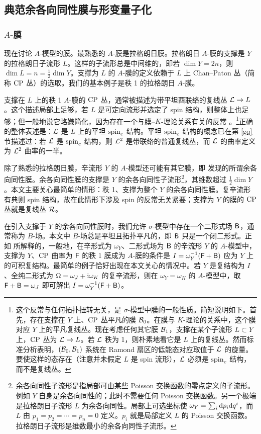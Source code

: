 \subsection{典范余各向同性膜与形变量子化}\label{abranes}

\subsubsection{$A$-膜}\label{aobranes}

现在讨论 $A$-模型的膜。最熟悉的 $A$-膜是拉格朗日膜。拉格朗日 $A$-膜的支撑是 $Y$ 的拉格朗日子流形 $L$。这样的子流形总是中间维的，即若 $\dim Y=2n$，则 $\dim L=n=\frac12\dim Y$。支撑为 $L$ 的 $A$-膜的定义依赖于 $L$ 上 Chan--Paton 丛（简称 ${\mathrm{CP}}$ 丛）的选取。我们的基本例子是秩 1 的拉格朗日 $A$-膜。

支撑在 $L$ 上的秩 1 $A$-膜的 ${\mathrm{CP}}$ 丛，通常被描述为带平坦酉联络的复线丛 ${\mathcal L}\to L$。这个描述局部上足够，若 $L$ 是可定向流形并选定了 spin 结构，则整体上也足够；但一般地说它略嫌简化，因为存在一个与膜--$K$-理论关系有关的反常 \cite{FW}。\footnote{\label{anomdesc}这个反常与任何拓扑扭转无关，是 $\sigma$-模型中膜的一般性质。简短说明如下。首先，存在支撑在 $Y$ 上、${\mathrm{CP}}$ 丛平凡的膜 ${\mathcal B}_0$。在膜与 $K$-理论的关系中，这个膜对应 $Y$ 上的平凡复线丛。现在考虑任何其它膜 ${\mathcal B}_1$，支撑在某个子流形 $L\subset Y$ 上，${\mathrm{CP}}$ 丛为 ${\mathcal L}\to L$。若 ${\mathcal L}$ 秩为 1，则朴素地看它是 $L$ 上的复线丛。然而标准分析表明，$({\mathcal B}_0,{\mathcal B}_1)$ 系统在 Ramond 扇区的低能态对应取值于 ${\mathcal L}$ 的旋量。要使这样的态存在（注意并未假定 $L$ 是 spin 流形），${\mathcal L}$ 必须是 ${\mathrm{spin}_c}$ 结构，而不是复线丛。}正确的整体表述是：${\mathcal L}$ 是 $L$ 上的平坦 ${\mathrm{spin}_c}$ 结构。平坦 ${\mathrm{spin}_c}$ 结构的概念已在第 \ref{gq} 节描述过：若 ${\mathcal L}$ 是 ${\mathrm{spin}_c}$ 结构，则 ${\mathcal L}^2$ 是带联络的普通复线丛，而 ${\mathcal L}$ 的曲率定义为 ${\mathcal L}^2$ 曲率的一半。

除了熟悉的拉格朗日膜，辛流形 $Y$ 的 $A$-模型还可能有其它膜，即 \cite{KO} 发现的所谓余各向同性膜。余各向同性膜的支撑是 $Y$ 的余各向同性子流形\footnote{余各向同性子流形是指局部可由某些 Poisson 交换函数的零点定义的子流形。例如 $Y$ 自身是余各向同性的；此时不需要任何 Poisson 交换函数。另一个极端是拉格朗日子流形 $L$ 为余各向同性。局部上可选坐标使 $\omega_Y=\sum_i{\mathrm d} p_i{\mathrm d} q^i$，而 $L$ 由 $p_1=p_2=\cdots=p_n=0$ 定义。$p_i$ 就是局部定义 $L$ 的 Poisson 交换函数。拉格朗日子流形是维数最小的余各向同性子流形。}，其维数超过 $\frac12\dim Y$。本文主要关心最简单的情形：秩 1、支撑为整个 $Y$ 的余各向同性膜。复辛流形有典则 spin 结构，故在此情形下涉及 spin 的反常无关紧要；支撑为 $Y$ 的膜的 ${\mathrm{CP}}$ 丛就是复线丛 ${\mathcal R}$。

在引入支撑于 $Y$ 的余各向同性膜时，我们允许 $\sigma$-模型中存在一个二形式场 ${\sf B}$，通常称为 $B$-场。本文中 $B$-场总是平坦且拓扑平凡的，即 ${\sf B}$ 只是一个闭二形式。正如 \cite{KO} 所解释的，一般地，在辛形式为 $\omega_Y$、二形式场为 ${\sf B}$ 的辛流形 $Y$ 的 $A$-模型中，支撑为 $Y$、${\mathrm{CP}}$ 曲率为 ${\sf F}$ 的秩 1 膜成为 $A$-膜的条件是 $I=\omega_Y^{-1}({\sf F}+{\sf B})$ 应为 $Y$ 上的可积复结构。最简单的例子恰好出现在本文关心的情况中。若 $Y$ 是复结构为 $I$、全纯二形式为 $\Omega=\omega_J+{\mathrm i}\omega_K$ 的复辛流形，则在 $\omega_Y=\omega_K$ 的 $A$-模型中，取 ${\sf F}+{\sf B}=\omega_J$ 即可解出 $I=\omega_Y^{-1}({\sf F}+{\sf B})$。

